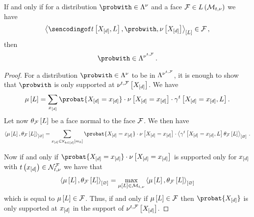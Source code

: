 \begin{lemma}
    \label{lem:faceMeasureRepCondition} %
    If and only if for a distribution $\probwith\in\distmeasuredby{\basemeasure}$ and a face $\mathcal{F}\in L\left(\mathcal{M}_{t,\nu}\right)$ we have
    \begin{align*}
        \contractionof{\sencsstatwith,\probwith,\basemeasurewith}{\selvariable}\in\facesymbol\, ,
    \end{align*}
    then %
    \begin{align*}
        \probwith \in \distmeasuredby{\genfacemeasure} \, .
    \end{align*}
\end{lemma}
\begin{proof}
    For a distribution $\probwith\in\distmeasuredby{\basemeasure}$ to be in $\Lambda^{\nu^{t,\mathcal{F}}}$, it is enough to show that $\probwith$ is only supported at $\nu^{t,\mathcal{F}}\left[X_{[d]}\right]$.
    We have
    \begin{align*}
        \meanparamat{\selvariable}
        = \sum_{\shortcatindices} \probat{\indexedshortcatvariables}\cdot\basemeasureat{\indexedshortcatvariables} \cdot \genstatshortcatencoding \, .
    \end{align*}
    Let now $\theta_{\mathcal{F}}\left[L\right]$ be a face normal to the face $\mathcal{F}$.
    We then have
    \begin{align*}
        \contraction{\meanparamwith,\canparamofat{\facesymbol}{\selvariable}}
        = \sum_{\shortcatindicesin}
        \probat{\indexedshortcatvariables}\cdot\basemeasureat{\indexedshortcatvariables} \cdot \contraction{\genstatshortcatencoding,\canparamofat{\facesymbol}{\selvariable}} \, .
    \end{align*}

    Now if and only if $\probat{\indexedshortcatvariables}\cdot\basemeasureat{\indexedshortcatvariables}$ is supported only for $x_{[d]}$ with $t\left(x_{[d]}\right)\in\mathcal{N}_{t,\nu}^{\mathcal{F}}$ we have that
    \begin{align*}
        \left\langle \mu\left[L\right],\theta_{\mathcal{F}}\left[L\right]\right\rangle_{\left[ \varnothing \right]}
        = \max_{\mu\left[L\right]\in\mathcal{M}_{t,\nu}} \left\langle \mu\left[L\right],\theta_{\mathcal{F}}\left[L\right]\right\rangle_{\left[ \varnothing \right]}
    \end{align*}
    which is equal to $\mu\left[L\right]\in\mathcal{F}$.
    Thus, if and only if $\mu\left[L\right]\in\mathcal{F}$ then $\probat{\shortcatvariables}$ is only supported at $x_{[d]}$ in the support of $\nu^{t,\mathcal{F}}\left[X_{[d]}\right]$.
\end{proof}


